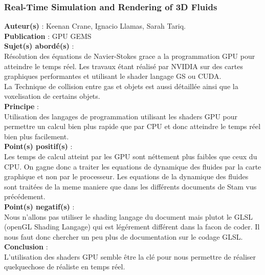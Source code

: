 \documentclass[a4paper,10pt]{article}
\begin{document}
\subsubsection{Real-Time Simulation and Rendering of 3D Fluids}
\textbf{Auteur(s)} : Keenan Crane, Ignacio Llamas, Sarah Tariq.\\
\textbf{Publication} : GPU GEMS \\
\textbf{Sujet(s) abordé(s)} : \\ 
	Résolution des équations de Navier-Stokes grace a la programmation GPU pour atteindre le temps réel. Les travaux étant réalisé par NVIDIA sur des cartes graphiques performantes et utilisant le shader langage GS ou CUDA.\\
	La Technique de collision entre gas et objets est aussi détaillée ainsi que la voxelisation de certains objets.\\
\textbf{Principe} :\\	
	Utilisation des langages de programmation utilisant les shaders GPU pour permettre un calcul bien plus rapide que par CPU et donc atteindre le temps réel bien plus facilement.\\
\textbf{Point(s) positif(s)} :\\
	Les temps de calcul atteint par les GPU sont néttement plus faibles que ceux du CPU. On gagne donc a traiter les equations de dynamique des fluides par la carte graphique et non par le processeur. Les equations de la dynamique des fluides sont traitées de la meme maniere que dans les différents documents de Stam vus précédement.\\
\textbf{Point(s) negatif(s)} :\\
	Nous n'allons pas utiliser le shading langage du document mais plutot le GLSL (openGL Shading Langage) qui est légérement différent dans la facon de coder. Il nous faut donc chercher un peu plus de documentation sur le codage GLSL.\\
\textbf{Conclusion} :\\
	L'utilisation des shaders GPU semble être la clé pour nous permettre de réaliser quelquechose de réaliste en temps réel.\\
\end{document}

